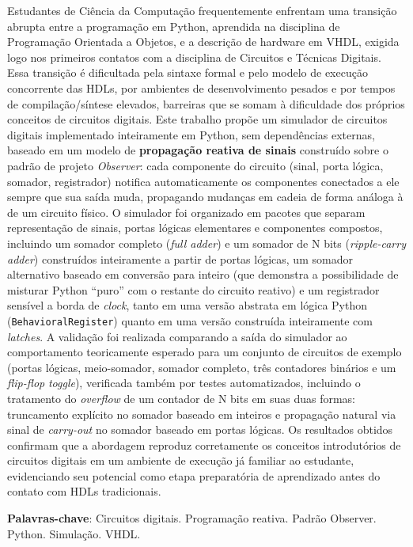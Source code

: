 \documentclass[12pt, a4paper, oneside]{abntex2}
\begin{document}
\begin{resumo}
Estudantes de Ciência da Computação frequentemente enfrentam uma transição abrupta entre a programação em Python, aprendida na disciplina de Programação Orientada a Objetos, e a descrição de hardware em VHDL, exigida logo nos primeiros contatos com a disciplina de Circuitos e Técnicas Digitais. Essa transição é dificultada pela sintaxe formal e pelo modelo de execução concorrente das HDLs, por ambientes de desenvolvimento pesados e por tempos de compilação/síntese elevados, barreiras que se somam à dificuldade dos próprios conceitos de circuitos digitais. Este trabalho propõe um simulador de circuitos digitais implementado inteiramente em Python, sem dependências externas, baseado em um modelo de \textbf{propagação reativa de sinais} construído sobre o padrão de projeto \textit{Observer}: cada componente do circuito (sinal, porta lógica, somador, registrador) notifica automaticamente os componentes conectados a ele sempre que sua saída muda, propagando mudanças em cadeia de forma análoga à de um circuito físico. O simulador foi organizado em pacotes que separam representação de sinais, portas lógicas elementares e componentes compostos, incluindo um somador completo (\textit{full adder}) e um somador de N bits (\textit{ripple-carry adder}) construídos inteiramente a partir de portas lógicas, um somador alternativo baseado em conversão para inteiro (que demonstra a possibilidade de misturar Python ``puro'' com o restante do circuito reativo) e um registrador sensível a borda de \textit{clock}, tanto em uma versão abstrata em lógica Python (\texttt{BehavioralRegister}) quanto em uma versão construída inteiramente com \textit{latches}. A validação foi realizada comparando a saída do simulador ao comportamento teoricamente esperado para um conjunto de circuitos de exemplo (portas lógicas, meio-somador, somador completo, três contadores binários e um \textit{flip-flop} \textit{toggle}), verificada também por testes automatizados, incluindo o tratamento do \textit{overflow} de um contador de N bits em suas duas formas: truncamento explícito no somador baseado em inteiros e propagação natural via sinal de \textit{carry-out} no somador baseado em portas lógicas. Os resultados obtidos confirmam que a abordagem reproduz corretamente os conceitos introdutórios de circuitos digitais em um ambiente de execução já familiar ao estudante, evidenciando seu potencial como etapa preparatória de aprendizado antes do contato com HDLs tradicionais.

\vspace{\onelineskip}
\noindent
\textbf{Palavras-chave}: Circuitos digitais. Programação reativa. Padrão Observer. Python. Simulação. VHDL.
\end{resumo}
\end{document}
